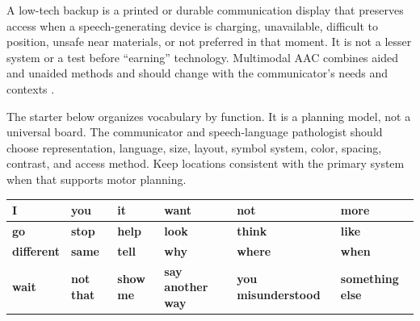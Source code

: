 
\vspace{-0.5cm}

A low-tech backup is a printed or durable communication display that preserves access when a speech-generating device is charging, unavailable, difficult to position, unsafe near materials, or not preferred in that moment. It is not a lesser system or a test before ``earning'' technology. Multimodal AAC combines aided and unaided methods and should change with the communicator's needs and contexts \citep{ashaAAC,mirenda2015aids}.

The starter below organizes vocabulary by function. It is a planning model, not a universal board. The communicator and speech-language pathologist should choose representation, language, size, layout, symbol system, color, spacing, contrast, and access method. Keep locations consistent with the primary system when that supports motor planning.


\renewcommand{\arraystretch}{1.30}
\setlength{\tabcolsep}{3pt}
\begin{tabularx}{\textwidth}{|>{\centering\arraybackslash}p{0.60in}|>{\centering\arraybackslash}p{0.70in}|>{\centering\arraybackslash}p{0.70in}|>{\centering\arraybackslash}X|>{\centering\arraybackslash}X|>{\centering\arraybackslash}X|}
\hline
\rowcolor{SoftBlue}\textbf{I} & \textbf{you} & \textbf{it} & \textbf{want} & \textbf{not} & \textbf{more} \\
\hline
\rowcolor{SoftGreen}\textbf{go} & \textbf{stop} & \textbf{help} & \textbf{look} & \textbf{think} & \textbf{like} \\
\hline
\rowcolor{SoftGold}\textbf{different} & \textbf{same} & \textbf{tell} & \textbf{why} & \textbf{where} & \textbf{when} \\
\hline
\rowcolor{SoftRose}\textbf{wait} & \textbf{not that} & \textbf{show me} & \textbf{say another way} & \textbf{you misunderstood} & \textbf{something else} \\
\hline
\end{tabularx}

\vspace{0.08in}

